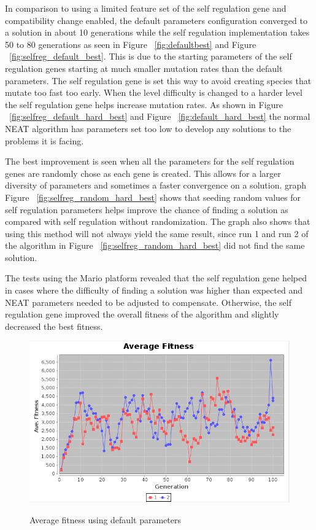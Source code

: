 \documentclass[12pt]{ucthesis} \newif\ifpdf \ifx\pdfoutput\undefined
\begin{document}
In comparison to using a limited feature set of the self regulation gene and
compatibility change enabled, the default parameters configuration converged to
a solution in about 10 generations while the self regulation implementation takes 50 to 80
generations as seen in Figure ~\ref{fig:defaultbest} and 
Figure ~\ref{fig:selfreg_default_best}. This is due to the starting parameters of the
self regulation genes starting at much smaller mutation rates than the default
parameters. The self regulation gene is set this way to avoid creating species
that mutate too fast too early.
When the level difficulty is changed to a harder level the self regulation gene
helps increase mutation rates. As shown in 
Figure ~\ref{fig:selfreg_default_hard_best} and Figure ~\ref{fig:default_hard_best} the normal
NEAT algorithm has parameters set too low to develop any solutions to the
problems it is facing.

The best improvement is seen when all the parameters for the self regulation
genes are randomly chose as each gene is created. This allows for a larger
diversity of parameters and sometimes a faster convergence on a solution. graph
Figure ~\ref{fig:selfreg_random_hard_best} shows that seeding random values for self
regulation parameters helps improve the chance of finding a solution as compared
with self regulation without randomization. The graph also shows that using this
method will not always yield the same result, since run 1 and run 2 of the
algorithm in Figure ~\ref{fig:selfreg_random_hard_best} did not find the same solution.

The tests using the Mario platform revealed that the self regulation gene helped
in cases where the difficulty of finding a solution was higher than expected and
NEAT parameters needed to be adjusted to compensate. Otherwise, the self
regulation gene improved the overall fitness of the algorithm and slightly
decreased the best fitness.

\begin{figure}[h!]
  \caption{Average fitness using default parameters}
  \centering
    \includegraphics[width=1\textwidth]{graphsone/defaultave.png}
   \label{fig:defaultave} 
\end{figure}
\end{document}
